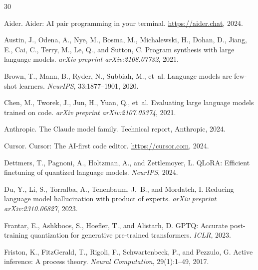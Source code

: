 
\begin{thebibliography}{30}

Aider.
\newblock Aider: AI pair programming in your terminal.
\newblock \url{https://aider.chat}, 2024.

Austin, J., Odena, A., Nye, M., Bosma, M., Michalewski, H., Dohan, D., Jiang,
  E., Cai, C., Terry, M., Le, Q., and Sutton, C.
\newblock Program synthesis with large language models.
\newblock \emph{arXiv preprint arXiv:2108.07732}, 2021.

Brown, T., Mann, B., Ryder, N., Subbiah, M., et~al.
\newblock Language models are few-shot learners.
\newblock \emph{NeurIPS}, 33:1877--1901, 2020.

Chen, M., Tworek, J., Jun, H., Yuan, Q., et~al.
\newblock Evaluating large language models trained on code.
\newblock \emph{arXiv preprint arXiv:2107.03374}, 2021.

Anthropic.
\newblock The Claude model family.
\newblock Technical report, Anthropic, 2024.

Cursor.
\newblock Cursor: The AI-first code editor.
\newblock \url{https://cursor.com}, 2024.

Dettmers, T., Pagnoni, A., Holtzman, A., and Zettlemoyer, L.
\newblock QLoRA: Efficient finetuning of quantized language models.
\newblock \emph{NeurIPS}, 2024.

Du, Y., Li, S., Torralba, A., Tenenbaum, J.~B., and Mordatch, I.
\newblock Reducing language model hallucination with product of experts.
\newblock \emph{arXiv preprint arXiv:2310.06827}, 2023.

Frantar, E., Ashkboos, S., Hoefler, T., and Alistarh, D.
\newblock GPTQ: Accurate post-training quantization for generative pre-trained
  transformers.
\newblock \emph{ICLR}, 2023.

Friston, K., FitzGerald, T., Rigoli, F., Schwartenbeck, P., and Pezzulo, G.
\newblock Active inference: A process theory.
\newblock \emph{Neural Computation}, 29(1):1--49, 2017.


\end{thebibliography}
